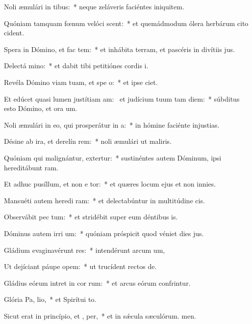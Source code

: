 \item Noli æmulári in tibus:~* neque zeláveris faciéntes iniquitem.
\item Quóniam tamquam fœnum velóci scent:~* et quemádmodum ólera herbárum cito cident.
\item Spera in Dómino, et fac tem:~* et inhábita terram, et pascéris in divítiis jus.
\item Delectá  mino:~* et dabit tibi petitiónes cordis i.
\item Revéla Dómino viam tuam, et spe  o:~* et ipse ciet.
\item Et edúcet quasi lumen justítiam am:~\pscross{} et judícium tuum tam diem:~* súbditus esto Dómino, et ora um.
\item Noli æmulári in eo, qui prosperátur in  a:~* in hómine faciénte injustias.
\item Désine ab ira, et derelín rem:~* noli æmulári ut maliris.
\item Quóniam qui malignántur, extertur:~* sustinéntes autem Dóminum, ipsi hereditábunt ram.
\item Et adhuc pusíllum, et non e tor:~* et quæres locum ejus et non innies.
\item Mansuéti autem heredi ram:~* et delectabúntur in multitúdine cis.
\item Observábit pec tum:~* et stridébit super eum déntibus is.
\item Dóminus autem irri um:~* quóniam próspicit quod véniet dies jus.
\item Gládium evaginavérunt res:~* intendérunt arcum um,
\item Ut dejíciant páupe  opem:~* ut trucídent rectos de.
\item Gládius eórum intret in cor rum:~* et arcus eórum confrintur.
\item Glória Pa,  lio,~* et Spirítui to.
\item Sicut erat in princípio, et ,  per,~* et in sǽcula sæculórum. men.
